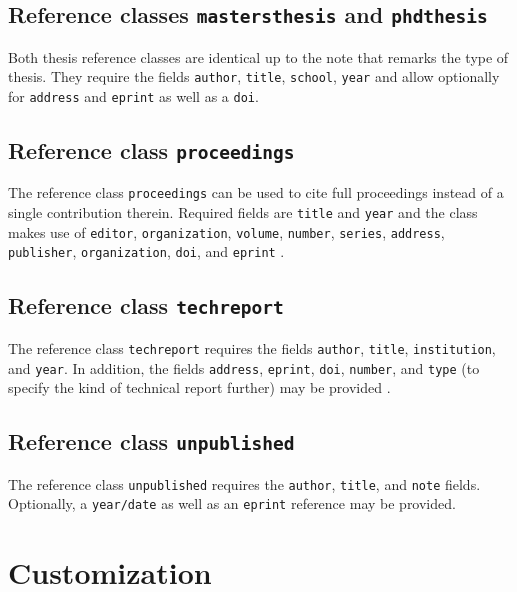 \documentclass[a4paper,twocolumn,11pt]{quantumarticle}
\begin{document}
\subsection{Reference classes \texttt{mastersthesis} and \texttt{phdthesis}}\label{sec:theses}
Both thesis reference classes are identical up to the note that remarks the type of thesis. They require the fields \texttt{author}, \texttt{title}, \texttt{school}, \texttt{year} and allow optionally for \texttt{address} and \texttt{eprint} as well as a \texttt{doi}.


\subsection{Reference class \texttt{proceedings}}\label{sec:proceedings}
The reference class \texttt{proceedings} can be used to cite full proceedings instead of a single contribution therein.
Required fields are \texttt{title} and \texttt{year} and the class makes use of \texttt{editor}, \texttt{organization}, \texttt{volume}, \texttt{number}, \texttt{series}, \texttt{address}, \texttt{publisher}, \texttt{organization}, \texttt{doi}, and \texttt{eprint} .

\subsection{Reference class \texttt{techreport}}\label{sec:techreport}
The reference class \texttt{techreport} requires the fields \texttt{author}, \texttt{title}, \texttt{institution}, and \texttt{year}.
In addition, the fields \texttt{address}, \texttt{eprint}, \texttt{doi}, \texttt{number}, and \texttt{type} (to specify the kind of technical report further) may be provided .

\subsection{Reference class \texttt{unpublished}}\label{sec:unpublished}
The reference class \texttt{unpublished} requires the \texttt{author}, \texttt{title}, and \texttt{note} fields.
Optionally, a \texttt{year/date} as well as an \texttt{eprint} reference may be provided.


\section{Customization}\label{sec:customization}
\end{document}
